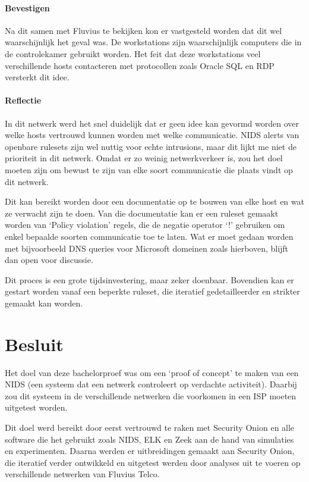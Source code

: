 \documentclass[a4paper,12pt]{report}
\begin{document}
\subsubsection{Bevestigen}
Na dit samen met Fluvius te bekijken kon er vastgesteld worden dat dit wel waarschijnlijk het geval was.
De workstations zijn waarschijnlijk computers die in de controlekamer gebruikt worden.
Het feit dat deze workstations veel verschillende hosts contacteren met protocollen zoals Oracle SQL en RDP versterkt dit idee.

\subsubsection{Reflectie}
In dit netwerk werd het snel duidelijk dat er geen idee kan gevormd worden over welke hosts vertrouwd kunnen worden met welke communicatie.
NIDS alerts van openbare rulesets zijn wel nuttig voor echte intrusions, maar dit lijkt me niet de prioriteit in dit netwerk.
Omdat er zo weinig netwerkverkeer is, zou het doel moeten zijn om bewust te zijn van elke soort communicatie die plaats vindt op dit netwerk.

Dit kan bereikt worden door een documentatie op te bouwen van elke host en wat ze verwacht zijn te doen.
Van die documentatie kan er een ruleset gemaakt worden van `Policy violation' regels, die de negatie operator `!' gebruiken om enkel bepaalde soorten communicatie toe te laten.
Wat er moet gedaan worden met bijvoorbeeld DNS queries voor Microsoft domeinen zoals hierboven, blijft dan open voor discussie.

Dit proces is een grote tijdsinvestering, maar zeker doenbaar.
Bovendien kan er gestart worden vanaf een beperkte ruleset, die iteratief gedetailleerder en strikter gemaakt kan worden.


\chapter*{Besluit}
Het doel van deze bachelorproef was om een `proof of concept' te maken van een NIDS (een systeem dat een netwerk controleert op verdachte activiteit).
Daarbij zou dit systeem in de verschillende netwerken die voorkomen in een ISP moeten uitgetest worden.

Dit doel werd bereikt door eerst vertrouwd te raken met Security Onion en alle software die het gebruikt zoals NIDS, ELK en Zeek aan de hand van simulaties en experimenten.
Daarna werden er uitbreidingen gemaakt aan Security Onion, die iteratief verder ontwikkeld en uitgetest werden door analyses uit te voeren op verschillende netwerken van Fluvius Telco.
\end{document}
